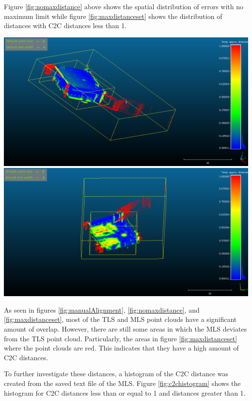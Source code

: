 \documentclass[man]{apa7}
\begin{document}
Figure \ref{fig:nomaxdistance} above shows the spatial distribution of errors with no maximum limit while figure \ref{fig:maxdistanceset} shows the distribution of distances with C2C distances less than 1.

\begin{minipage}{\linewidth}
  \includegraphics[height=\textheight/4 ,width=\textwidth/2]{figures/DistanceModel2.png}
  \includegraphics[height=\textheight/4 ,width=\textwidth/2]{figures/DistanceModel.png}
  \label{fig:maxdistanceset}
\end{minipage}

As seen in figures \ref{fig:manualAlignment}, \ref{fig:nomaxdistance}, and \ref{fig:maxdistanceset}, most of the TLS and MLS point clouds have a significant amount of overlap. However, there are still some areas in which the MLS deviates from the TLS point cloud. Particularly, the areas in figure  \ref{fig:maxdistanceset} where the point clouds are red. This indicates that they have a high amount of C2C distances.


To further investigate these distances, a histogram of the C2C distance was created from the saved text file of the MLS. Figure \ref{fig:c2chistogram} shows the histogram for C2C distances less than or equal to 1 and distances greater than 1.
\end{document}
